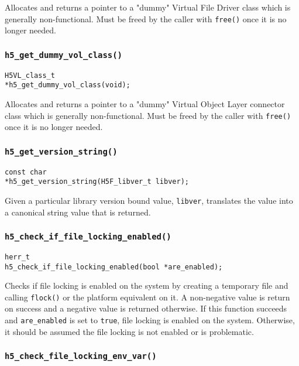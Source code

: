 \documentclass[../HDF5_RFC.tex]{subfiles}
\begin{document}
Allocates and returns a pointer to a "dummy" Virtual File Driver class which is generally
non-functional. Must be freed by the caller with \texttt{free()} once it is no longer needed.

\subsubsection{\texttt{h5\_get\_dummy\_vol\_class()}}

\begin{verbatim}
H5VL_class_t
*h5_get_dummy_vol_class(void);
\end{verbatim}

Allocates and returns a pointer to a "dummy" Virtual Object Layer connector class which is
generally non-functional. Must be freed by the caller with \texttt{free()} once it is no longer
needed.

\subsubsection{\texttt{h5\_get\_version\_string()}}

\begin{verbatim}
const char
*h5_get_version_string(H5F_libver_t libver);
\end{verbatim}

Given a particular library version bound value, \texttt{libver}, translates the value into
a canonical string value that is returned.

\subsubsection{\texttt{h5\_check\_if\_file\_locking\_enabled()}}

\begin{verbatim}
herr_t
h5_check_if_file_locking_enabled(bool *are_enabled);
\end{verbatim}

Checks if file locking is enabled on the system by creating a temporary file and calling
\texttt{flock()} or the platform equivalent on it. A non-negative value is return on success
and a negative value is returned otherwise. If this function succeeds and \texttt{are\_enabled}
is set to \texttt{true}, file locking is enabled on the system. Otherwise, it should be assumed
the file locking is not enabled or is problematic.

\subsubsection{\texttt{h5\_check\_file\_locking\_env\_var()}}
\end{document}
